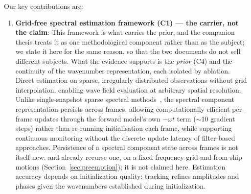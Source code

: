 \documentclass[review]{elsarticle}
\begin{document}
Our key contributions are:
\begin{enumerate}
  \item \textbf{Grid-free spectral estimation framework (C1) --- the carrier,
    not the claim}: This framework is what carries the prior, and the companion
    thesis treats it as one methodological component rather than as the subject;
    we state it here for the same reason, so that the two documents do not sell
    different subjects. What the evidence supports is the \emph{prior} (C4) and the
    continuity of the wavenumber representation, each isolated by ablation. Direct
    estimation on sparse, irregularly distributed observations without
    grid interpolation, enabling wave field evaluation at arbitrary
    spatial resolution.
    Unlike single-snapshot sparse spectral methods~\citep{donelan1996},
    the spectral component representation persists across frames,
    allowing computationally efficient per-frame updates through the forward
    model's own $-\omega t$ term ($\sim$10 gradient steps)
    rather than re-running initialisation each frame,
    while supporting continuous monitoring without the discrete
    update latency of filter-based approaches.
    Persistence of a spectral component state across frames is not itself new:
    \citet{Pascoal2017DirSpectra} and \citet{Kim2019InverseKF} already recurse one,
    on a fixed frequency grid and from ship motions
    (Section~\ref{sec:preemption}); it is not claimed here.
    Estimation accuracy depends on initialization quality;
    tracking refines amplitudes and phases given the wavenumbers
    established during initialization.

\end{enumerate}
\end{document}
